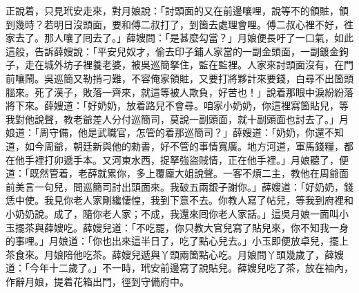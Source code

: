 正說着，只見玳安走來，對月娘說：「討頭面的又在前邊嚷哩，說等不的領賍，領到幾時？若明日沒頭面，要和傅二叔打了，到箇去處理會哩。傅二叔心裡不好，徃家去了。那人嚷了囘去了。」薛嫂問：「是甚麼勾當？」月娘便長吁了一口氣，如此這般，告訴薛嫂說：「平安兒奴才，偷去印子鋪人家當的一副金頭面，一副鍍金鉤子，走在城外坊子裡養老婆，被吳巡簡拏住，監在監裡。人家來討頭面沒有，在門前嚷鬧。吳巡簡又勒掯刁難，不容俺家領賍，又要打將夥計來要錢，白尋不出箇頭腦來。死了漢子，敗落一齊來，就這等被人欺負，好苦也！」說着那眼中淚紛紛落將下來。{}薛嫂道：「好奶奶，放着路兒不會尋。咱家小奶奶，你這裡寫箇貼兒，等我對他說聲，教老爺差人分付巡簡司，莫說一副頭面，就十副頭面也討去了。」月娘道：「周守備，他是武職官，怎管的着那巡簡司？」薛嫂道：「奶奶，你還不知道，如今周爺，朝廷新與他的勑書，好不管的事情寬廣。地方河道，軍馬錢糧，都在他手裡打卯遞手本。又河東水西，捉拏強盜賊情，正在他手裡。」月娘聽了，便道：「既然管着，老薛就累你，多上覆龐大姐說聲。一客不煩二主，教他在周爺面前美言一句兒，問巡簡司討出頭面來。我破五兩銀子謝你。」薛嫂道：「好奶奶，錢恁中使。我見你老人家剛纔悽惶，我到下意不去。你教人寫了帖兒，等我到府裡和小奶奶說。成了，隨你老人家；不成，我還來囘你老人家話。」這吳月娘一面叫小玉擺茶與薛嫂吃。薛嫂兒道：「不吃罷，你只教大官兒寫了貼兒來，你不知我一身的事哩。」月娘道：「你也出來這半日了，吃了點心兒去。」小玉即便放卓兒，擺上茶食來。月娘陪他吃茶。薛嫂兒遞與丫頭兩箇點心吃。月娘問丫頭幾歲了，薛嫂道：「今年十二歲了。」不一時，玳安前邊寫了說貼兒。薛嫂兒吃了茶，放在袖內，作辭月娘，提着花箱出門，徑到守備府中。

